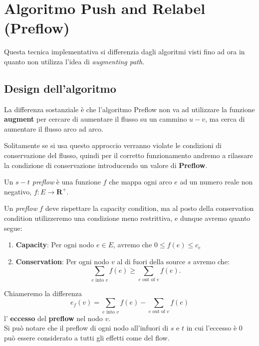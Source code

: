 \chapter{Algoritmo Push and Relabel (Preflow)}

Questa tecnica implementativa si differenzia dagli algoritmi visti fino ad ora in
quanto non utilizza l'idea di \textit{augmenting path}.

\section{Design dell'algoritmo}

La differenza sostanziale è che l'algoritmo Preflow non va ad utilizzare la
funzione \textbf{augment} per cercare di aumentare il flusso su un cammino $u -
      v$, ma cerca di aumentare il flusso arco ad arco.

Solitamente se si usa questo approccio verranno violate le condizioni di
conservazione del flusso, quindi per il corretto funzionamento andremo a
rilassare la condizione di conservazione introducendo un valore di
\textbf{Preflow}.

\begin{myblockquote}
      Un \textit{$s-t$ preflow } è una funzione $f$ che mappa ogni arco $e$ ad un
      numero reale non negativo, $f: E \rightarrow \mathbf{R^+}$.
\end{myblockquote}

Un \textit{preflow} $f$ deve rispettare la capacity condition, ma al posto della
conservation condition utilizzeremo una condizione meno restrittiva, e dunque
avremo quanto segue:
\begin{enumerate}
      \item \textbf{Capacity}: Per ogni nodo $e \in E$, avremo che $0 \le f(e) \le
                  c_e$
      \item \textbf{Conservation}: Per ogni nodo $v$ al di fuori della source $s$
            avremo che:
            $$
                  \sum_{e \text{ into }v}f(e) \ge \sum_{e \text{ out of }v}f(e).
            $$
\end{enumerate}

Chiameremo la differenza
$$
      e_f(v) = \sum_{e \text{ into }v}f(e) - \sum_{e \text{ out of }v}f(e)
$$
l' \textbf{eccesso} del \textbf{preflow} nel nodo $v$.\\

Si può notare che il preflow di ogni nodo all'infuori di $s$ e $t$ in cui
l'eccesso è 0 può essere considerato a tutti gli effetti come del flow.

